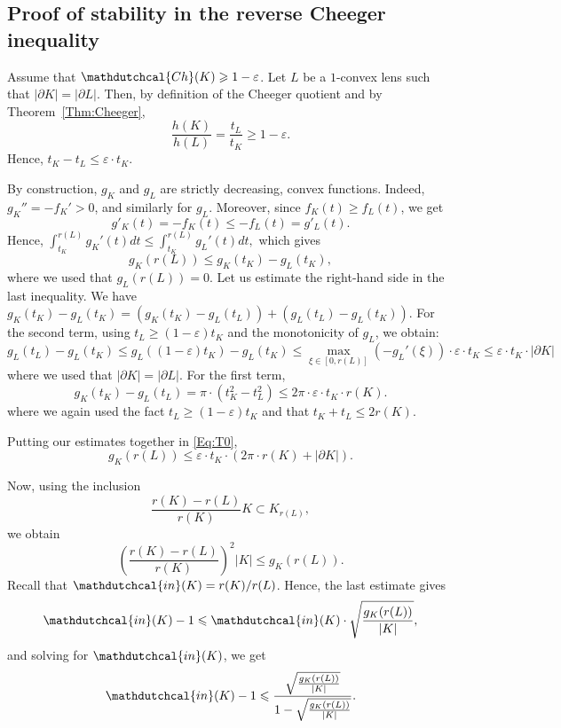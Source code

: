 \documentclass[11pt, oneside]{amsart}
\newcommand{\Rr}{\mathdutchcal{in}}
\newcommand{\Ch}{\mathdutchcal{Ch}}
\newcommand{\eps}{\varepsilon}
\renewcommand{\ge}{\geqslant}
\renewcommand{\le}{\leqslant}
\theoremstyle{theorem}
\theoremstyle{Intro}
\theoremstyle{definition}
\theoremstyle{remark}
\theoremstyle{claim}
\numberwithin{equation}{section}
\begin{document}
\subsection{Proof of stability in the reverse Cheeger inequality}

Assume that $\Ch(K) \ge 1 - \eps$. Let $L$ be a $1$-convex lens such that $|\partial K| = |\partial L|$. Then, by definition of the Cheeger quotient and by Theorem~\ref{Thm:Cheeger}, 
\[
\frac{h(K)}{h(L)} = \frac{t_L}{t_K} \ge 1-\eps.
\]
Hence, $t_K - t_L \le \eps \cdot t_K$.

By construction, $g_K$ and $g_L$ are strictly decreasing, convex functions. Indeed, $g_K'' = -f_K' > 0$, and similarly for $g_L$. Moreover, since $f_K(t) \ge f_L(t)$, we get 
\[
g'_K(t) = -f_K(t) \le -f_L(t) = g'_L(t).
\]
Hence, 
$
\int_{t_K}^{r(L)} g_K'(t) dt \le \int_{t_K}^{r(L)} g_L'(t) dt,
$
which gives
\begin{equation}
    \label{Eq:T0}
    g_K(r(L)) \le g_K(t_K) - g_L(t_K),
\end{equation}
where we used that $g_L(r(L)) = 0$.
Let us estimate the right-hand side in the last inequality. We have $g_K(t_K) - g_L(t_K) = (g_K(t_K) - g_L(t_L)) + (g_L(t_L) - g_L(t_K))$. For the second term, using $t_L \ge (1 - \eps)t_K$ and the monotonicity of $g_L$, we obtain:
\[
g_L(t_L) - g_L(t_K) \le g_L((1 - \eps)t_K) - g_L\left(t_K\right) \le \max_{\xi \in [0, r(L)]}\left(-g_L'(\xi)\right) \cdot \eps \cdot t_K \le \eps \cdot t_K \cdot |\partial K|
\]
where we used that $|\partial K| = |\partial L|$. For the first term,
\[
g_K(t_K) - g_L(t_L) = \pi \cdot (t_K^2 - t_L^2) \le 2\pi \cdot \eps \cdot t_K \cdot r(K).
\]
where we again used the fact $t_L \ge (1 - \eps)t_K$ and that $t_K+t_L \le 2 r(K)$.

Putting our estimates together in \eqref{Eq:T0},
\begin{equation}
    \label{Eq:T1}
    g_K(r(L)) \le \eps \cdot t_K \cdot \left(2\pi \cdot r(K) + |\partial K|\right).
\end{equation}

Now, using the inclusion \cite[Eq. (2.4)]{HS} 
\[
\frac{r(K) - r(L)}{r(K)} K \subset K_{r(L)},
\]
we obtain 
\[
\left(\frac{r(K)-r(L)}{r(K)}\right)^2 |K| \le g_K(r(L)).
\]
Recall that $\Rr(K) = r(K)/r(L)$. Hence, the last estimate gives
\[
\Rr(K) - 1 \le \Rr(K) \cdot \sqrt{\frac{g_K(r(L))}{|K|}},
\]
and solving for $\Rr(K)$, we get
\begin{equation}
\label{Eq:1}
    \Rr(K)-1 \le \frac{\sqrt{\frac{g_K(r(L))}{|K|}}}{1-\sqrt{\frac{g_K(r(L))}{|K|}}}.
\end{equation}
\end{document}
